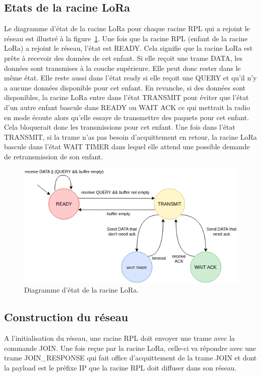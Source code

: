 \subsection*{Etats de la racine LoRa}
    Le diagramme d'état de la racine LoRa pour chaque racine RPL qui a rejoint le réseau est illustré à la figure~\ref{fig:archi-state-lora}. Une fois que la racine RPL (enfant de la racine LoRa) a rejoint le réseau, l'état est READY. Cela signifie que la racine LoRa est prête à recevoir des données de cet enfant. Si elle reçoit une trame DATA, les données sont transmises à la couche supérieure. Elle peut donc rester dans le même état. Elle reste aussi dans l'état ready si elle reçoit une QUERY et qu'il n'y a aucune données disponible pour cet enfant. En revanche, si des données sont disponibles, la racine LoRa entre dans l'état TRANSMIT pour éviter que l'état d'un autre enfant bascule dans READY ou WAIT ACK ce qui mettrait la radio en mode écoute alors qu'elle essaye de transmettre des paquets pour cet enfant. Cela bloquerait donc les transmissions pour cet enfant. Une fois dans l'état TRANSMIT, si la trame n'as pas besoin d'acquittement en retour, la racine LoRa bascule dans l'état WAIT TIMER dans lequel elle attend une possible demande de retransmission de son enfant.

    \begin{figure}[H]
        \centering
        \includegraphics[scale=0.5]{res/pictures/loramac-loraroot-state.drawio.png}
        \caption{Diagramme d'état de la racine LoRa.}
        \label{fig:archi-state-lora}
    \end{figure}

\subsection*{Construction du réseau}
    A l'initialisation du réseau, une racine RPL doit envoyer une trame avec la commande JOIN. Une fois reçue par la racine LoRa, celle-ci va répondre avec une trame JOIN\_RESPONSE qui fait office d'acquittement de la trame JOIN et dont la payload est le préfixe IP que la racine RPL doit diffuser dans son réseau.


